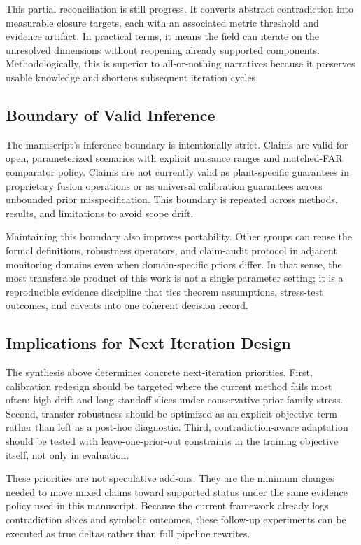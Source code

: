 \documentclass{article} %
\begin{document}
This partial reconciliation is still progress. It converts abstract contradiction into measurable closure targets, each with an associated metric threshold and evidence artifact. In practical terms, it means the field can iterate on the unresolved dimensions without reopening already supported components. Methodologically, this is superior to all-or-nothing narratives because it preserves usable knowledge and shortens subsequent iteration cycles.

\subsection{Boundary of Valid Inference}
The manuscript's inference boundary is intentionally strict. Claims are valid for open, parameterized scenarios with explicit nuisance ranges and matched-FAR comparator policy. Claims are not currently valid as plant-specific guarantees in proprietary fusion operations or as universal calibration guarantees across unbounded prior misspecification. This boundary is repeated across methods, results, and limitations to avoid scope drift.

Maintaining this boundary also improves portability. Other groups can reuse the formal definitions, robustness operators, and claim-audit protocol in adjacent monitoring domains even when domain-specific priors differ. In that sense, the most transferable product of this work is not a single parameter setting; it is a reproducible evidence discipline that ties theorem assumptions, stress-test outcomes, and caveats into one coherent decision record.

\subsection{Implications for Next Iteration Design}
The synthesis above determines concrete next-iteration priorities. First, calibration redesign should be targeted where the current method fails most often: high-drift and long-standoff slices under conservative prior-family stress. Second, transfer robustness should be optimized as an explicit objective term rather than left as a post-hoc diagnostic. Third, contradiction-aware adaptation should be tested with leave-one-prior-out constraints in the training objective itself, not only in evaluation.

These priorities are not speculative add-ons. They are the minimum changes needed to move mixed claims toward supported status under the same evidence policy used in this manuscript. Because the current framework already logs contradiction slices and symbolic outcomes, these follow-up experiments can be executed as true deltas rather than full pipeline rewrites.
\end{document}
